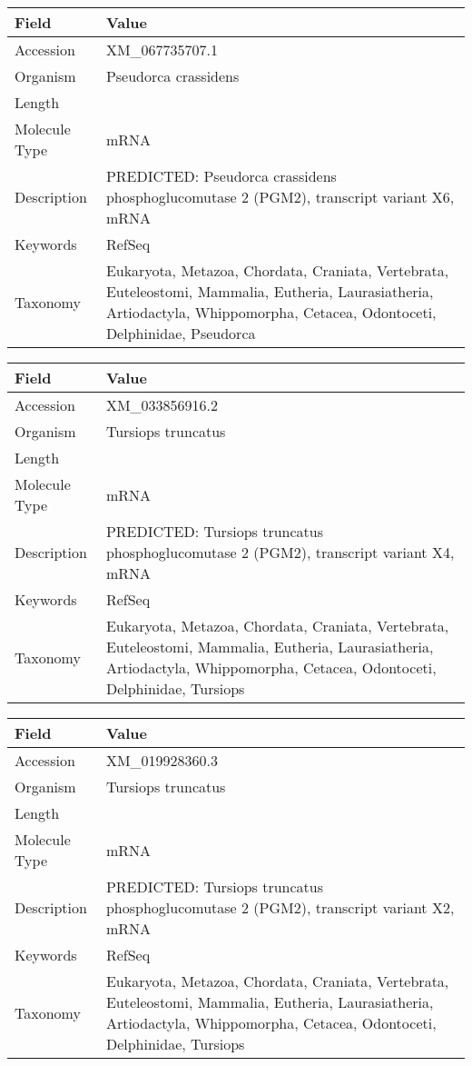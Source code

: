 \documentclass[10pt]{article}
\begin{document}
{\footnotesize
\begin{longtable}{>{\raggedright\arraybackslash}p{4.5cm} >{\raggedright\arraybackslash}p{11.5cm}}
\textbf{Field} & \textbf{Value} \\
\hline
Accession & XM\_067735707.1 \\
Organism & Pseudorca crassidens \\
Length & 12448 \\
Molecule Type & mRNA \\
Description & PREDICTED: Pseudorca crassidens phosphoglucomutase 2 (PGM2), transcript variant X6, mRNA \\
Keywords & RefSeq \\
Taxonomy & Eukaryota, Metazoa, Chordata, Craniata, Vertebrata, Euteleostomi, Mammalia, Eutheria, Laurasiatheria, Artiodactyla, Whippomorpha, Cetacea, Odontoceti, Delphinidae, Pseudorca \\
\end{longtable}
}

{\footnotesize
\begin{longtable}{>{\raggedright\arraybackslash}p{4.5cm} >{\raggedright\arraybackslash}p{11.5cm}}
\textbf{Field} & \textbf{Value} \\
\hline
Accession & XM\_033856916.2 \\
Organism & Tursiops truncatus \\
Length & 3463 \\
Molecule Type & mRNA \\
Description & PREDICTED: Tursiops truncatus phosphoglucomutase 2 (PGM2), transcript variant X4, mRNA \\
Keywords & RefSeq \\
Taxonomy & Eukaryota, Metazoa, Chordata, Craniata, Vertebrata, Euteleostomi, Mammalia, Eutheria, Laurasiatheria, Artiodactyla, Whippomorpha, Cetacea, Odontoceti, Delphinidae, Tursiops \\
\end{longtable}
}

{\footnotesize
\begin{longtable}{>{\raggedright\arraybackslash}p{4.5cm} >{\raggedright\arraybackslash}p{11.5cm}}
\textbf{Field} & \textbf{Value} \\
\hline
Accession & XM\_019928360.3 \\
Organism & Tursiops truncatus \\
Length & 3473 \\
Molecule Type & mRNA \\
Description & PREDICTED: Tursiops truncatus phosphoglucomutase 2 (PGM2), transcript variant X2, mRNA \\
Keywords & RefSeq \\
Taxonomy & Eukaryota, Metazoa, Chordata, Craniata, Vertebrata, Euteleostomi, Mammalia, Eutheria, Laurasiatheria, Artiodactyla, Whippomorpha, Cetacea, Odontoceti, Delphinidae, Tursiops \\
\end{longtable}
}
\end{document}
